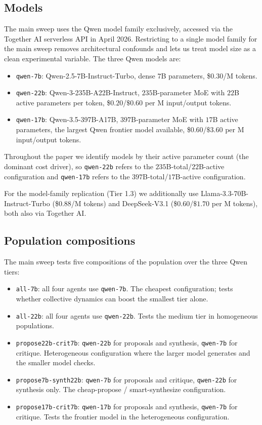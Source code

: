\documentclass[11pt]{amsart}
\newcommand\1{{\mathds{1}}}
\theoremstyle{definition}
\theoremstyle{remark}
\numberwithin{equation}{section}
\begin{document}
\subsection{Models}\label{sec:models}

The main sweep uses the Qwen model family exclusively, accessed via the Together AI serverless API in April 2026.
Restricting to a single model family for the main sweep removes architectural confounds and lets us treat model size as a clean experimental variable.
The three Qwen models are:
\begin{itemize}[leftmargin=1.2em, itemsep=2pt]
\item \texttt{qwen-7b}: Qwen-2.5-7B-Instruct-Turbo, dense $7$B parameters, \$$0.30$/M tokens.
\item \texttt{qwen-22b}: Qwen-3-235B-A22B-Instruct, $235$B-parameter MoE with $22$B active parameters per token, \$$0.20$/$\$0.60$ per M input/output tokens.
\item \texttt{qwen-17b}: Qwen-3.5-397B-A17B, $397$B-parameter MoE with $17$B active parameters, the largest Qwen frontier model available, \$$0.60$/$\$3.60$ per M input/output tokens.
\end{itemize}
Throughout the paper we identify models by their active parameter count (the dominant cost driver), so \texttt{qwen-22b} refers to the $235$B-total/$22$B-active configuration and \texttt{qwen-17b} refers to the $397$B-total/$17$B-active configuration.

For the model-family replication (Tier 1.3) we additionally use Llama-3.3-70B-Instruct-Turbo (\$$0.88$/M tokens) and DeepSeek-V3.1 (\$$0.60$/$\$1.70$ per M tokens), both also via Together AI.

\subsection{Population compositions}\label{sec:configs}

The main sweep tests five compositions of the population over the three Qwen tiers:
\begin{itemize}[leftmargin=1.2em, itemsep=2pt]
\item \texttt{all-7b}: all four agents use \texttt{qwen-7b}. The cheapest configuration; tests whether collective dynamics can boost the smallest tier alone.
\item \texttt{all-22b}: all four agents use \texttt{qwen-22b}. Tests the medium tier in homogeneous populations.
\item \texttt{propose22b-crit7b}: \texttt{qwen-22b} for proposals and synthesis, \texttt{qwen-7b} for critique. Heterogeneous configuration where the larger model generates and the smaller model checks.
\item \texttt{propose7b-synth22b}: \texttt{qwen-7b} for proposals and critique, \texttt{qwen-22b} for synthesis only. The cheap-propose / smart-synthesize configuration.
\item \texttt{propose17b-crit7b}: \texttt{qwen-17b} for proposals and synthesis, \texttt{qwen-7b} for critique. Tests the frontier model in the heterogeneous configuration.
\end{itemize}
\end{document}
